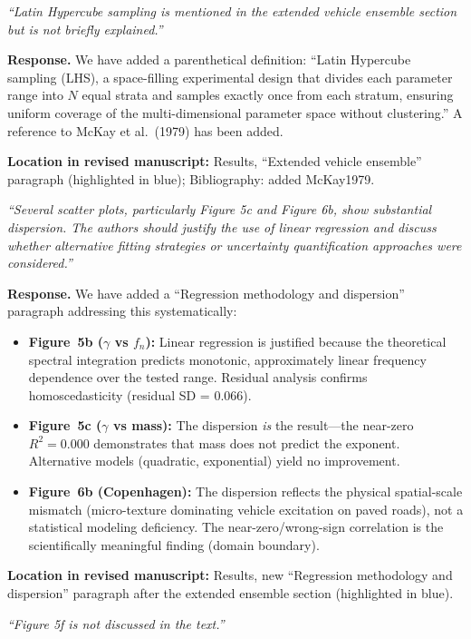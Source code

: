 \documentclass[11pt]{article}
\newcommand{\revquote}[1]{\medskip\noindent\textit{``#1''}\medskip}
\newcommand{\revloc}[1]{\noindent\textbf{Location in revised manuscript:} #1\medskip}
\begin{document}
\revquote{Latin Hypercube sampling is mentioned in the extended vehicle ensemble section but is not briefly explained.}

\noindent\textbf{Response.} We have added a parenthetical definition: ``Latin Hypercube sampling (LHS), a space-filling experimental design that divides each parameter range into $N$ equal strata and samples exactly once from each stratum, ensuring uniform coverage of the multi-dimensional parameter space without clustering.'' A reference to McKay et al.\ (1979) has been added.

\revloc{Results, ``Extended vehicle ensemble'' paragraph (highlighted in blue); Bibliography: added McKay1979.}

\bigskip

\revquote{Several scatter plots, particularly Figure 5c and Figure 6b, show substantial dispersion. The authors should justify the use of linear regression and discuss whether alternative fitting strategies or uncertainty quantification approaches were considered.}

\noindent\textbf{Response.} We have added a ``Regression methodology and dispersion'' paragraph addressing this systematically:

\begin{itemize}[leftmargin=*]
\item \textbf{Figure~5b ($\gamma$ vs $f_n$):} Linear regression is justified because the theoretical spectral integration predicts monotonic, approximately linear frequency dependence over the tested range. Residual analysis confirms homoscedasticity (residual SD = 0.066).
\item \textbf{Figure~5c ($\gamma$ vs mass):} The dispersion \emph{is} the result---the near-zero $R^2 = 0.000$ demonstrates that mass does not predict the exponent. Alternative models (quadratic, exponential) yield no improvement.
\item \textbf{Figure~6b (Copenhagen):} The dispersion reflects the physical spatial-scale mismatch (micro-texture dominating vehicle excitation on paved roads), not a statistical modeling deficiency. The near-zero/wrong-sign correlation is the scientifically meaningful finding (domain boundary).
\end{itemize}

\revloc{Results, new ``Regression methodology and dispersion'' paragraph after the extended ensemble section (highlighted in blue).}

\bigskip

\revquote{Figure 5f is not discussed in the text.}
\end{document}

